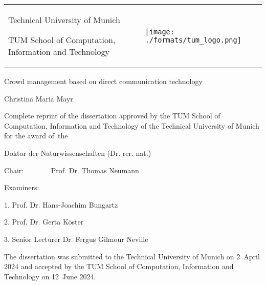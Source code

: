 \begin{titlepage}





\begin{tabular}{p{13cm}p{4cm}}
{
Technical University of Munich

TUM School of Computation, Information and Technology \newline
} & \vspace{-0.3cm} \texttt{[image: ./formats/tum\_logo.png]}  \\ 
\end{tabular} 

\vspace{3.0cm}



\begin{center}
 {\Large
Crowd management based on direct communication technology} 



{Christina Maria Mayr}


\end{center}




\vspace{1.9cm}
\begin{spacing}{1.5}
Complete reprint of the dissertation approved by the TUM School of Computation, Information and Technology of the Technical University of Munich for the award of~the
\end{spacing}
\vspace{-0.1cm}
\begin{center}
{Doktor der Naturwissenschaften (Dr. rer. nat.) }
\end{center}

\vspace{-0.1cm}



\vspace{2.3cm}
Chair: ~~~~~~\, Prof. Dr. Thomas Neumann

\vspace{0.5cm}
Examiners:


\hspace{2cm}1. Prof. Dr. Hans-Joachim Bungartz

\hspace{2cm}2. Prof. Dr. Gerta Köster

\hspace{2cm}3. Senior Lecturer Dr. Fergus Gilmour Neville


\vspace{1cm}
\begin{spacing}{1.5}
The dissertation was submitted to the Technical University of Munich on 2~April 2024
and accepted by the TUM School of Computation, Information and Technology on 12~June 2024.
\end{spacing}

\end{titlepage}